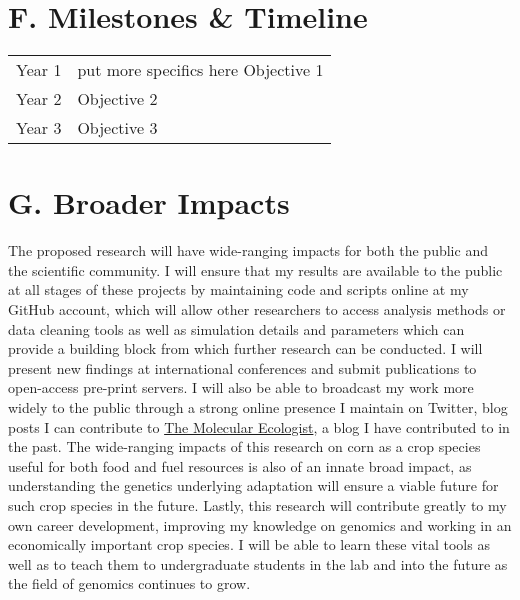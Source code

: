 \section*{F. Milestones \& Timeline}
\begin{tabular}{ll}
Year 1 \hspace{0.5in} & put more specifics here Objective 1 \\
Year 2                     & Objective 2  \\
Year 3		& Objective 3 \\
\end{tabular}

\section*{G. Broader Impacts}

The proposed research will have wide-ranging impacts for both the public and the scientific community. I will ensure that my results are available to the public at all stages of these projects by maintaining code and scripts online at my GitHub account, which will allow other researchers to access analysis methods or data cleaning tools as well as simulation details and parameters which can provide a building block from which further research can be conducted. I will present new findings at international conferences and submit publications to open-access pre-print servers. I will also be able to broadcast my work more widely to the public through a strong online presence I maintain on Twitter, blog posts I can contribute to \href{http://www.molecularecologist.com/}{The Molecular Ecologist}, a blog I have contributed to in the past. The wide-ranging impacts of this research on corn as a crop species useful for both food and fuel resources is also of an innate broad impact, as understanding the genetics underlying adaptation will ensure a viable future for such crop species in the future. Lastly, this research will contribute greatly to my own career development, improving my knowledge on genomics and working in an economically important crop species. I will be able to learn these vital tools as well as to teach them to undergraduate students in the lab and into the future as the field of genomics continues to grow.


